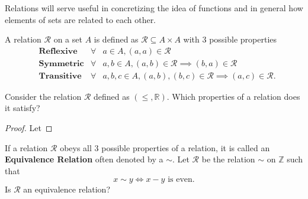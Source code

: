 \documentclass[../notes.tex]{subfiles}
\begin{document}

Relations will serve useful in concretizing the idea of functions and in general how elements of sets are related to each other.

\hfil\linebreak

\begin{definition}[Relation]
	A relation $\mathcal{R}$ on a set $A$ is defined as $\mathcal{R} \subseteq A \times A$ with 3 possible properties
	\begin{align*}
		&\textbf{Reflexive} &\forall &a \in A, (a,a) \in \mathcal{R} \\
		&\textbf{Symmetric} &\forall &a,b \in A, (a,b) \in \mathcal{R} \implies (b,a) \in \mathcal{R} \\
		&\textbf{Transitive} &\forall &a,b,c \in A, (a,b), (b,c) \in \mathcal{R} \implies (a,c) \in \mathcal{R}
	.\end{align*}
\end{definition}

Consider the relation $\mathcal{R}$ defined as $(\leq, \mathbb{R})$. Which properties of a relation does it satisfy?

\begin{proof}
	Let 
\end{proof}

If a relation $\mathcal{R}$ obeys all 3 possible properties of a relation, it is called an \textbf{Equivalence Relation} often denoted by a $\sim$. Let $\mathcal{R}$ be the relation $\sim$ on $\mathbb{Z}$ such that
\[
	x \sim y \Longleftrightarrow x - y \text{ is even}
.\]
Is $\mathcal{R}$ an equivalence relation?
\end{document}
